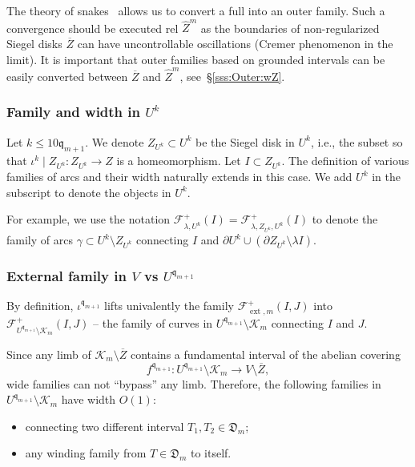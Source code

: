 \documentclass{amsart}
\newcommand{\1}{{\mathbb 1 }}
\newcommand{\ext}{{\operatorname{ext}}}
\newcommand{\Fam}{{\mathcal F}}
\newcommand{\wZ}{{\widehat Z}}
\newcommand{\qq}{\mathfrak{q}}
\newcommand{\Dbb}{{\mathfrak{D}}}
\theoremstyle{remark}
\numberwithin{equation}{section}
\theoremstyle{definition}
\newcommand{\filled}{{\mathcal {K} }}
\begin{document}
The theory of snakes~\cite[\S6]{DL22} allows us to convert a full into an outer family. Such a convergence should be executed rel $\wZ^m$ as the boundaries of non-regularized Siegel disks $\overline Z$ can have uncontrollable oscillations (Cremer phenomenon in the limit). It is important that outer families based on grounded intervals can be easily converted between $\overline Z$ and $\wZ^m$, see~\S\ref{sss:Outer:wZ}.

\subsubsection{Family and width in $U^k$} \label{sss:famU^k} 
Let $k \leq 10\qq_{m+1}$. We denote $Z_{U^k} \subset U^k$ be the Siegel disk in $U^k$, i.e., the subset so that $\iota^k \mid Z_{U^k}: Z_{U^k} \longrightarrow Z$ is a homeomorphism.
Let $I \subset Z_{U^k}$. The definition of various families of arcs and their width naturally extends in this case. We add $U^k$ in the subscript to denote the objects in $U^k$.

For example, we use the notation $\Fam^{+}_{\lambda, U^k}(I) = \Fam^{+}_{\lambda, Z_{U^k}, U^k}(I)$ to denote the family of arcs $\gamma \subset U^k \setminus Z_{U^k}$ connecting $I$ and $\partial U^k \cup (\partial Z_{U^k} \setminus \lambda I)$.

\subsubsection{External family in $V$ vs $U^{\qq_{m+1}}$} \label{subsubsec:efVvsU}
By definition, $\iota^{\qq_{m+1}}$ lifts univalently the family $\Fam^+_{\ext, m}(I,J)$ into $\Fam^+_{U^{\qq_{m+1}}\setminus \filled_m}(I,J)$ -- the family of curves in $U^{\qq_{m+1}}\setminus \filled_m$ connecting $I$ and $J$. 

Since any limb of $\filled_m\setminus \overline Z$ contains a fundamental interval of the abelian covering \[f^{\qq_{m+1}}\colon U^{\qq_{m+1}}\setminus \filled_m \to V\setminus \overline Z,\]
wide families can not ``bypass'' any limb. 
Therefore, the following families in $ U^{\qq_{m+1}}\setminus \filled_m $ have width $O(1)$:
\begin{itemize}
    \item connecting two different interval $T_1,T_2\in \Dbb_m$;
    \item any winding family from $T\in \Dbb_m$ to itself.
\end{itemize}
\end{document}
